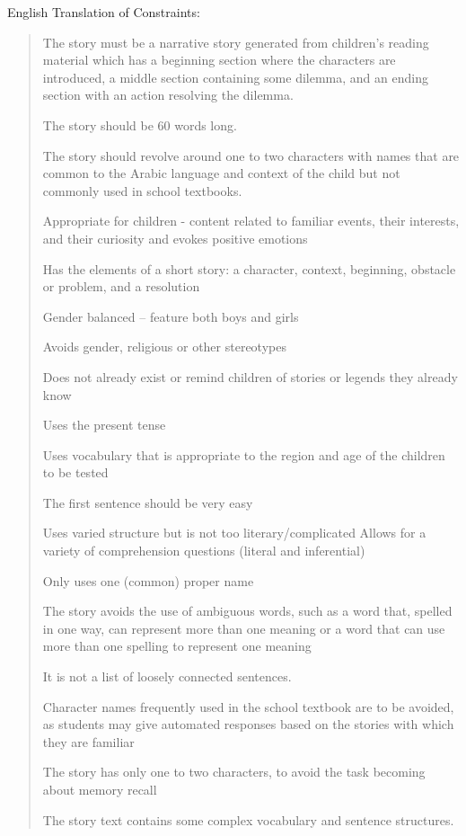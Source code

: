 \documentclass[11pt]{article}
\begin{document}
English Translation of Constraints:
\begin{quote}
The story must be a narrative story generated from children’s reading material which has a beginning section where the characters are introduced, a middle section containing some dilemma, and an ending section with an action resolving the dilemma.

The story should be 60 words long.

The story should revolve around one to two characters with names that are common to the Arabic language and context of the child but not commonly used in school textbooks.

Appropriate for children - content related to familiar events, their interests, and their curiosity and evokes positive emotions

Has the elements of a short story: a character, context, beginning, obstacle or problem, and a resolution

Gender balanced – feature both boys and girls

Avoids gender, religious or other stereotypes

Does not already exist or remind children of stories or legends they already know

Uses the present tense

Uses vocabulary that is appropriate to the region and age of the children to be tested

The first sentence should be very easy

Uses varied structure but is not too literary/complicated
Allows for a variety of comprehension questions (literal and inferential)

Only uses one (common) proper name

The story avoids the use of ambiguous words, such as a word that, spelled in one way, can represent more than one meaning or a word that can use more than one spelling to represent one meaning

It is not a list of loosely connected sentences.

Character names frequently used in the school textbook are to be avoided, as students may give automated responses based on the stories with which they are familiar

The story has only one to two characters, to avoid the task becoming about memory recall

The story text contains some complex vocabulary and sentence structures.

\end{quote}
\end{document}
